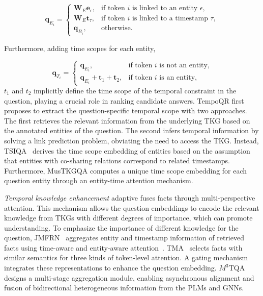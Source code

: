 {$$\mathbf{q}_{E_i}= \begin{cases} \mathbf{W}_E\mathbf{e}_\epsilon, & \text{if token }i\text{ is linked to an entity }\epsilon, \\ \mathbf{W}_E\mathbf{t}_\tau, & \text{if token }i\text{ is linked to a timestamp }\tau, \\ \mathbf{q}_{B_i}, & \text{otherwise.} \end{cases}$$

Furthermore, adding time scopes for each entity,  

$$\mathbf{q}_{T_i}= \begin{cases} \mathbf{q}_{E_i}, & \text{if token }i\text{ is not an entity,} \\ \mathbf{q}_{E_i}+\mathbf{t}_1+\mathbf{t}_2, & \text{if token }i\text{ is an entity,} \end{cases}$$
$t_1$ and $t_2$ implicitly define the time scope of the temporal constraint in the question, playing a crucial role in ranking candidate answers.
TempoQR first proposes to extract the question-specific temporal scope with two approaches. The ﬁrst retrieves the relevant information from the underlying TKG based on the annotated entities of the question. The second infers temporal information by solving a link prediction problem, obviating the need to access the TKG. Instead, TSIQA~\cite{xiaoModelingTemporalSensitiveInformation2022a} derives the time scope embedding of entities based on the assumption that entities with co-sharing relations correspond to related timestamps. Furthermore, MusTKGQA computes a unique time scope embedding for each question entity through an entity-time attention mechanism.

\textit{Temporal knowledge enhancement} adaptive fuses facts through multi-perspective attention. This mechanism allows the question embeddings to encode the relevant knowledge from TKGs with different degrees of importance, which can promote understanding.
To emphasize the importance of different knowledge for the question, JMFRN~\cite{huangJointMultiFactsReasoning2024} aggregates entity and timestamp information of retrieved facts using time-aware and entity-aware attention~\cite{vaswaniAttentionAllYou2023}.
TMA~\cite{liuTimeAwareMultiwayAdaptive2023} selects facts with similar semantics for three kinds of token-level attention. A gating mechanism integrates these representations to enhance the question embedding. $M^3$TQA~\cite{zhaM3TQAMultiViewMultiHop2024a} designs a multi-stage aggregation module, enabling asynchronous alignment and fusion of bidirectional heterogeneous information from the PLMs and GNNs.

}
